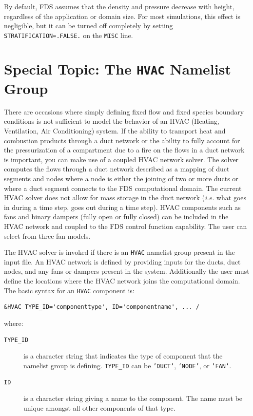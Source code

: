 \documentclass[11pt]{book}
\newcommand{\ct}{\tt\small}
\begin{document}
By default, FDS assumes that the density and pressure decrease with height, regardless of the
application or domain size. For most simulations, this effect is negligible, but it can be
turned off completely by setting {\ct STRATIFICATION=.FALSE.} on the {\ct MISC} line.

\clearpage

\section{Special Topic: The \texorpdfstring{{\tt HVAC}}{HVAC} Namelist Group}
\label{info:HVAC}

There are occasions where simply defining fixed flow and fixed species boundary conditions is not sufficient to model the behavior of an HVAC (Heating, Ventilation,
Air Conditioning) system.
If the ability to transport heat and combustion products through a duct network or the ability to fully account for the pressurization of a compartment
due to a fire on the flows in a duct network is important, you can make use of a coupled HVAC network solver.  The solver computes the flows through a
duct network described as a mapping of duct segments and nodes where a node is either the joining of two or more ducts or where a duct segment connects to the FDS computational domain.
The current HVAC solver does not allow for mass storage in the duct network ({\em i.e.} what goes in during a time step, goes out during a time step).
HVAC components such as fans and binary dampers (fully open or fully closed) can be included in the HVAC network and coupled to the FDS control function capability.  The
user can select from three fan models.

The HVAC solver is invoked if there is an {\ct HVAC} namelist group present in the input file.
An HVAC network is defined by providing inputs for the ducts, duct nodes, and any fans or dampers present in the system.
Additionally the user must define the locations where the HVAC network joins the computational domain.  The basic syntax for an {\ct HVAC} component is:

\footnotesize
\begin{verbatim}
&HVAC TYPE_ID='componenttype', ID='componentname', ... /
\end{verbatim}\normalsize

\noindent
where:

\begin{description}
\item[{\ct TYPE\_ID}] is a character string that indicates the type of component that the namelist group is defining.   {\ct TYPE\_ID} can be {\ct 'DUCT'}, {\ct 'NODE'}, or {\ct 'FAN'}.
\item[{\ct ID}] is a character string giving a name to the component.  The name must be unique amongst all other components of that type.
\end{description}
\end{document}
